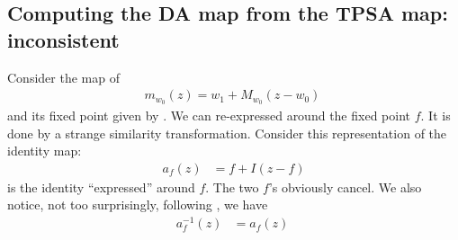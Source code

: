\documentclass{hitec}     %
\begin{document}
{{{{{\subsection{Computing the DA map from the TPSA map: inconsistent}\label{s:dafromtpsa}

Consider the map of 
%
\begin{align} {m}_{{w}_{0}}\left({z}\right)={w}_{1}+{M}_{{w}_{0}}(z-{w}_{0})\ \label{eq:fpeqz} \end{align}
%
%
and its fixed point given by . We can re-expressed around the fixed point $f$. It is done by a strange similarity transformation. Consider this representation of the identity map:
%
\begin{align} {a}_{f}\left({z}\right)&=f+I\left({z-f}\right) \label{eq:idf}\end{align}
%
 is the identity ``expressed'' around $f$. The two $f$'s obviously cancel.  We also notice, not too surprisingly,  following  , we have 
%
\begin{align} {a}_{f}^{-1}\left({z}\right)&={a}_{f}\left({z}\right)\ \label{eq:ainv}\end{align}

}}}}}
\end{document}
